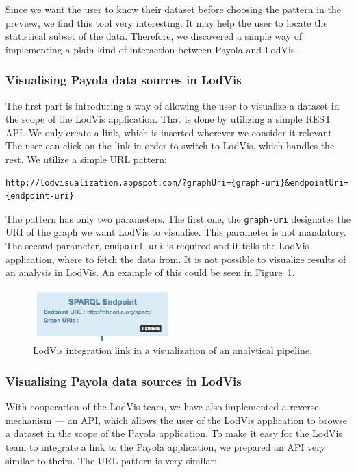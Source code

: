 Since we want the user to know their dataset before choosing the pattern in the 
preview, we find this tool very interesting. It may help the user to locate the 
statistical subset of the data. Therefore, we discovered a simple way of 
implementing a plain kind of interaction between Payola and LodVis.

\subsubsection{Visualising Payola data sources in LodVis}
The first part is introducing a way of allowing the user to visualize a 
dataset in the scope of the LodVis application. That is done by utilizing a 
simple REST API. We only create a link, which is inserted wherever we consider it 
relevant. The user can click on the link in order to switch to LodVis,
which handles the rest. We utilize a simple URL pattern:

{  \scriptsize
\begin{verbatim}
http://lodvisualization.appspot.com/?graphUri={graph-uri}&endpointUri={endpoint-uri}
\end{verbatim}
}

The pattern has only two parameters. The first one, the \texttt{graph-uri} 
designates the URI of the graph we want LodVis to visualise. This parameter is 
not mandatory. The second parameter, \texttt{endpoint-uri} is required and it 
tells the LodVis application, where to fetch the data from. It is not possible 
to visualize results of an analysis in LodVis. An example of this could
be seen in Figure~\ref{fig:lodvis-int}.

\begin{figure}
	\centering
	\includegraphics[width=55mm]{img/lodvis-int.png}
	\caption{LodVis integration link in a visualization of an analytical pipeline.}
	\label{fig:lodvis-int}
\end{figure}


\subsubsection{Visualising Payola data sources in LodVis}
With cooperation of the LodVis team, we have also implemented a reverse 
mechanism --- an API, which allows the user of the LodVis application to browse a 
dataset in the scope of the Payola application. To make it easy for the LodVis 
team to integrate a link to the Payola application, we prepared an API very 
similar to theirs. The URL pattern is very similar:

